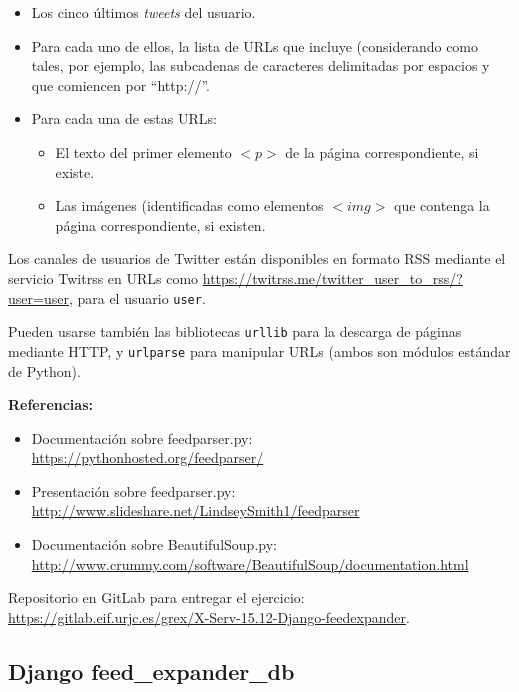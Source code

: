 \begin{itemize}
\item Los cinco últimos \emph{tweets} del usuario.
\item Para cada uno de ellos, la lista de URLs que incluye (considerando como tales, por ejemplo, las subcadenas de caracteres delimitadas por espacios y que comiencen por ``http://''.
\item Para cada una de estas URLs:
  \begin{itemize}
  \item El texto del primer elemento $<p>$ de la página correspondiente, si existe.
  \item Las imágenes (identificadas como elementos $<img>$ que contenga la página correspondiente, si existen.
  \end{itemize}
\end{itemize}

Los canales de usuarios de Twitter están disponibles en formato RSS mediante el servicio Twitrss en URLs como \url{https://twitrss.me/twitter_user_to_rss/?user=user}, para el usuario \texttt{user}.

Pueden usarse también las bibliotecas \texttt{urllib} para la descarga de páginas mediante HTTP, y \texttt{urlparse} para manipular URLs (ambos son módulos estándar de Python).

\textbf{Referencias:}

\begin{itemize}
\item Documentación sobre feedparser.py: \\
  \url{https://pythonhosted.org/feedparser/}
\item Presentación sobre feedparser.py: \\
  \url{http://www.slideshare.net/LindseySmith1/feedparser}
\item Documentación sobre BeautifulSoup.py: \\
  \url{http://www.crummy.com/software/BeautifulSoup/documentation.html}
\end{itemize}


Repositorio en GitLab para entregar el ejercicio: \\ 
\url{https://gitlab.eif.urjc.es/grex/X-Serv-15.12-Django-feedexpander}.


\subsection{Django feed\_expander\_db}
\label{subsec:django-feed-expander-db}

